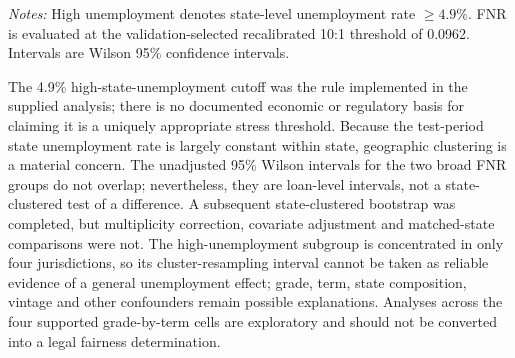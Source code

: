 \documentclass[10pt]{article}
\begin{document}
\begin{table}[!ht]
\centering
\caption{Sample-qualified grade-by-term diagnostics at the recalibrated 10:1 threshold. Cells are reported only when both unemployment groups contain at least 10 adverse outcomes and at least 10 non-events.}
\label{tab:supported_slices}

\vspace{3pt}
{\footnotesize \textit{Notes:} High unemployment denotes state-level unemployment rate $\geq4.9\%$. FNR is evaluated at the validation-selected recalibrated 10:1 threshold of 0.0962. Intervals are Wilson 95\% confidence intervals.}
\end{table}

The 4.9\% high-state-unemployment cutoff was the rule implemented in the supplied analysis; there is no documented economic or regulatory basis for claiming it is a uniquely appropriate stress threshold. Because the test-period state unemployment rate is largely constant within state, geographic clustering is a material concern. The unadjusted 95\% Wilson intervals for the two broad FNR groups do not overlap; nevertheless, they are loan-level intervals, not a state-clustered test of a difference. A subsequent state-clustered bootstrap was completed, but multiplicity correction, covariate adjustment and matched-state comparisons were not. The high-unemployment subgroup is concentrated in only four jurisdictions, so its cluster-resampling interval cannot be taken as reliable evidence of a general unemployment effect; grade, term, state composition, vintage and other confounders remain possible explanations. Analyses across the four supported grade-by-term cells are exploratory and should not be converted into a legal fairness determination.
\end{document}
